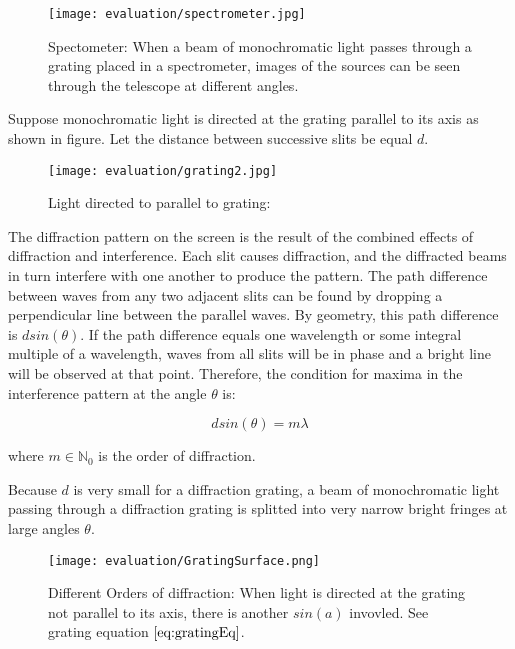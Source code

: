 \begin{figure}[ht]
  \centering
  \texttt{[image: evaluation/spectrometer.jpg]}
  \label{fig:spectometer}
  \caption{Spectometer: When a beam of monochromatic light passes through a grating placed in a spectrometer, images of the sources can be seen through the telescope at different angles.}
\end{figure}

Suppose monochromatic light is directed at the grating parallel to its axis as shown in figure. Let the distance between successive slits be equal $d$.

\begin{figure}[ht]
  \centering
  \texttt{[image: evaluation/grating2.jpg]}
  \label{fig:lighthitsgrating}
  \caption{Light directed to parallel to grating:}
\end{figure}

The diffraction pattern on the screen is the result of the combined effects of diffraction and interference. Each slit causes diffraction, and the diffracted beams in turn interfere with one another to produce the pattern. The path difference between waves from any two adjacent slits can be found by dropping a perpendicular line between the parallel waves. By geometry, this path difference is $d sin(\theta)$. If the path difference equals one wavelength or some integral multiple of a wavelength, waves from all slits will be in phase and a bright line will be observed at that point. Therefore, the condition for maxima in the interference pattern at the angle $\theta$ is: 

\begin{equation}
 d sin(\theta) = m \lambda 
\end{equation}

where $m \in \mathds{N}_0$ is the order of diffraction.

Because $d$ is very small for a diffraction grating, a beam of monochromatic light passing through a diffraction grating is splitted into very narrow bright fringes at large angles $\theta$.

\begin{figure}[ht]
  \centering
  \texttt{[image: evaluation/GratingSurface.png]}
  \caption{Different Orders of diffraction: When light is directed at the grating not parallel to its axis, there is another $sin(a)$ invovled. See grating equation $\ref{eq:gratingEq}$.}
\label{fig:gratingdiffractionorders}
\end{figure}

